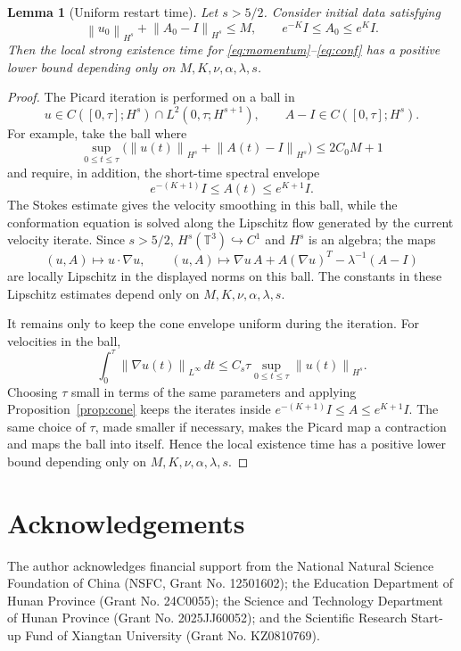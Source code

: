 \documentclass[11pt]{article}
\numberwithin{equation}{section}
\newtheorem{lemma}[theorem]{Lemma}
\newcommand{\T}{\mathbb T}
\newcommand{\Id}{I}
\newcommand{\norm}[1]{\left\lVert #1\right\rVert}
\begin{document}
\begin{lemma}[Uniform restart time]
\label{lem:appendix-restart}
Let \(s>5/2\).  Consider initial data satisfying
\[
  \norm{u_0}_{H^s}+\norm{A_0-\Id}_{H^s}\le M,
  \qquad
  e^{-K}\Id\le A_0\le e^K\Id .
\]
Then the local strong existence time for \eqref{eq:momentum}--\eqref{eq:conf}
has a positive lower bound depending only on \(M,K,\nu,\alpha,\lambda,s\).
\end{lemma}

\begin{proof}
The Picard iteration is performed on a ball in
\[
  u\in C([0,\tau];H^s)\cap L^2(0,\tau;H^{s+1}),
  \qquad
  A-\Id\in C([0,\tau];H^s).
\]
For example, take the ball where
\[
  \sup_{0\le t\le\tau}
  \bigl(\norm{u(t)}_{H^s}+\norm{A(t)-\Id}_{H^s}\bigr)\le 2C_0M+1
\]
and require, in addition, the short-time spectral envelope
\[
  e^{-(K+1)}\Id\le A(t)\le e^{K+1}\Id .
\]
The Stokes estimate gives the velocity smoothing in this ball, while the
conformation equation is solved along the Lipschitz flow generated by the
current velocity iterate.  Since \(s>5/2\), \(H^s(\T^3)\hookrightarrow C^1\)
and \(H^s\) is an algebra; the maps
\[
  (u,A)\mapsto u\cdot\nabla u,\qquad
  (u,A)\mapsto \nabla u\,A+A(\nabla u)^T-\lambda^{-1}(A-\Id)
\]
are locally Lipschitz in the displayed norms on this ball.  The constants in
these Lipschitz estimates depend only on \(M,K,\nu,\alpha,\lambda,s\).

It remains only to keep the cone envelope uniform during the iteration.
For velocities in the ball,
\[
  \int_0^\tau\norm{\nabla u(t)}_{L^\infty}\,dt
  \le C_s\tau\sup_{0\le t\le\tau}\norm{u(t)}_{H^s}.
\]
Choosing \(\tau\) small in terms of the same parameters and applying
Proposition~\ref{prop:cone} keeps the iterates inside
\(e^{-(K+1)}\Id\le A\le e^{K+1}\Id\).  The same choice of \(\tau\), made
smaller if necessary, makes the Picard map a contraction and maps the ball
into itself.  Hence the local existence time has a positive lower bound
depending only on \(M,K,\nu,\alpha,\lambda,s\).
\end{proof}

\section*{Acknowledgements}

\begin{sloppypar}
The author acknowledges financial support from the National Natural Science
Foundation of China (NSFC, Grant No. 12501602); the Education Department of
Hunan Province (Grant No. 24C0055); the Science and Technology Department of
Hunan Province (Grant No. 2025JJ60052); and the Scientific Research Start-up
Fund of Xiangtan University (Grant No. KZ0810769).
\end{sloppypar}
\end{document}
